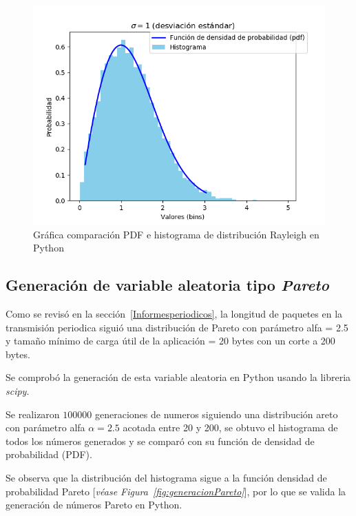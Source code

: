 \begin{figure}[th]
    \centering
    \includegraphics[scale=.7]{Figures/RayleighDistribution.png}
    \decoRule
    \caption[Gráfica comparación PDF e histograma de distribución Rayleigh en Python]{Gráfica comparación PDF e histograma de distribución Rayleigh en Python}
    \label{fig:generacionRay}
\end{figure}
\break

\subsection{Generación de variable aleatoria tipo \textit{Pareto}}

Como se revisó en la sección~\ref{Informesperiodicos}, la longitud de paquetes en la transmisión periodica siguió una distribución de Pareto con parámetro alfa = 2.5 y tamaño mínimo de carga útil de la aplicación = 20 bytes con un corte a 200 bytes.\newline

Se comprobó la generación de esta variable aleatoria en Python usando la libreria \textit{scipy}.\newline

Se realizaron $100000$ generaciones de numeros siguiendo una distribución areto con parámetro alfa  $\alpha =2.5$ acotada entre 20 y 200, se obtuvo el histograma de todos los números generados y se comparó con su función de densidad de probabilidad (PDF).\newline

Se observa que la distribución del histograma sigue a la función densidad de probabilidad Pareto [\textit{véase Figura~\ref{fig:generacionPareto}}], por lo que se valida la generación de números Pareto en Python.\newline

